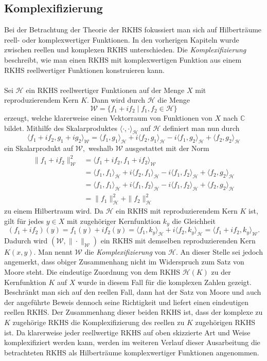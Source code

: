 \documentclass[12pt,titlepage,twoside,cleardoublepage]{article}
\theoremstyle{nummermitklammern}
\numberwithin{equation}{section}
\begin{document}
\subsection{Komplexifizierung}
Bei der Betrachtung der Theorie der RKHS fokussiert man sich auf Hilberträume reell- oder komplexwertiger Funktionen. 
In den vorherigen Kapiteln wurde zwischen reellen und komplexen RKHS unterschieden. Die \emph{Komplexifizierung}  beschreibt, wie man einen RKHS mit komplexwertigen Funktion aus einem RKHS reellwertiger Funktionen konstruieren kann.\\\\
 Sei $\mathcal{H}$ ein RKHS reellwertiger Funktionen auf der Menge $X$ mit reproduzierendem Kern $K.$ Dann wird durch $\mathcal{H}$ die Menge
\[
  \mathcal{W}=\{f_1+if_2\mid f_1,f_2\in \mathcal{H}\}
\]  
 erzeugt, welche klarerweise einen Vektorraum von Funktionen von $X$ nach $\mathbb{C}$ bildet. Mithilfe des Skalarproduktes $\langle \cdot ,\cdot\rangle_{\mathcal{H}}$ auf $\mathcal{H}$ definiert man nun durch
 \[
\langle f_1+if_2,g_1+ig_2\rangle_{\mathcal{W}}=\langle f_1 ,g_1\rangle_{\mathcal{H}}+i\langle f_2,g_1\rangle_{\mathcal{H}}-i\langle f_1,g_2\rangle_{\mathcal{H}}+\langle f_2,g_2 \rangle_{\mathcal{H}}
 \] 
 ein Skalarprodukt auf $\mathcal{W},$ weshalb $\mathcal{W}$ ausgestattet mit der Norm 
 \begin{align*}
\|f_1+if_2\|^2_{\mathcal{W}}&=\langle f_1+if_2,f_1+if_2 \rangle_{\mathcal{W}} \\
&=\langle f_1 ,f_1\rangle_{\mathcal{H}}+i\langle f_2,f_1\rangle_{\mathcal{H}}-i\langle f_1,f_2\rangle_{\mathcal{H}}+\langle f_2,g_2
 \rangle_{\mathcal{H}}\\
 &=\langle f_1 ,f_1\rangle_{\mathcal{H}}+i\langle f_1,f_2\rangle_{\mathcal{H}}-i\langle f_1,f_2\rangle_{\mathcal{H}}+\langle f_2,g_2\rangle_{\mathcal{H}}\\
 &=\|f_1\|_{\mathcal{H}}^2+\|f_2\|^2_\mathcal{H}
  \end{align*}
  zu einem Hilbertraum wird. Da $\mathcal{H}$ ein RKHS mit reproduzierendem Kern $K$ ist, gilt für jedes $y\in X$ mit zugehöriger Kernfunktion $k_y$ die Gleichheit 
   \[
   (f_1+if_2)(y)=f_1(y)+if_2(y)=\langle f_1,k_y\rangle_{\mathcal{H}} +i\langle f_2,k_y\rangle_{\mathcal{H}} = \langle f_1+if_2,k_y\rangle_{\mathcal{W}}.
   \]
    Dadurch wird $(\mathcal{W},\|\cdot\|_{\mathcal{W}})$ ein RKHS mit demselben reproduzierenden Kern $K(x,y)$.
     Man nennt $\mathcal{W}$ die \emph{Komplexifizierung} von $\mathcal{H}.$ An dieser Stelle sei jedoch angemerkt, dass obiger Zusammenhang nicht im Widerspruch zum Satz von Moore steht. Die eindeutige Zuordnung von dem RKHS $\mathcal{H}(K)$ zu der Kernfunktion $K$ auf $X$ wurde in diesem Fall für die komplexen Zahlen gezeigt. Beschränkt man sich auf den reellen Fall, dann hat der Satz von Moore und auch der angeführte Beweis dennoch seine Richtigkeit und liefert einen eindeutigen reellen RKHS. Der Zusammenhang dieser beiden RKHS ist, dass der komplexe zu $K$ zugehörige RKHS die Komplexifizierung des reellen zu $K$ zugehörigen RKHS ist.  Da klarerweise jeder reellwertige RKHS auf oben skizzierte Art und Weise komplexifiziert werden kann, werden im weiteren Verlauf dieser Ausarbeitung die betrachteten RKHS als Hilberträume komplexwertiger Funktionen angenommen.
\end{document}
